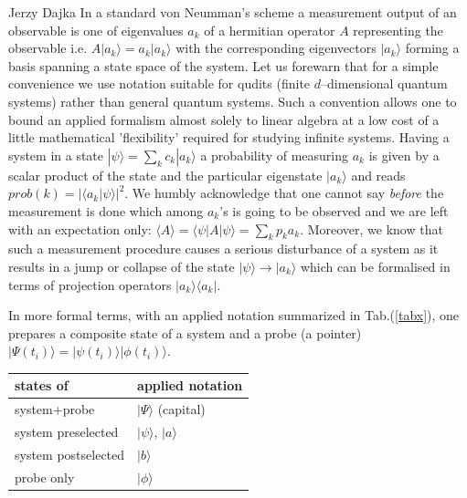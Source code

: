 \begin{artengenv}{Jerzy Dajka}
In a  standard von Neumman's scheme a measurement output of an observable   is one of eigenvalues $a_k$ of  a hermitian operator $A$ representing the observable i.e. $A|a_k\rangle=a_k|a_k\rangle$ with the corresponding eigenvectors  $|a_k\rangle$ forming a basis spanning a state space of the system. Let us forewarn that for a simple convenience we use notation suitable for qudits (finite $d$--dimensional quantum systems) rather than general quantum systems. Such a convention allows one to bound an applied formalism almost solely to linear algebra at a low cost of a little  mathematical 'flexibility' required for studying infinite systems.  Having a system in a state $|\psi\rangle=\sum_k c_k |a_k\rangle$ a probability of measuring $a_k$ is given by a scalar product of the state and the particular eigenstate  $|a_k\rangle$ and reads  $prob(k)=|\langle a_k|\psi\rangle|^2$. We humbly acknowledge that one cannot say {\it before} the measurement is done which among $a_k$'s is going to be  observed and we are left with an expectation only:   $\langle A\rangle =\langle\psi| A|\psi\rangle=\sum_k p_k a_k$. Moreover, we know that such a measurement procedure
     causes a  serious disturbance of a system as it results in  a jump or collapse of the state $|\psi\rangle\rightarrow|a_k\rangle$ which can be formalised in terms of projection operators $|a_k\rangle\langle a_k|$. 



In more formal terms, with an applied notation summarized in Tab.(\ref{tabx}), one prepares a composite state of a system and a probe (a pointer) 
  $|\Psi(t_i)\rangle=|\psi(t_i)\rangle|\phi(t_i)\rangle$. 
\begin{table}[ht]
\centering
\begin{tabular}{|l||l|}
\hline
states of  &applied  notation \\
\hline
\hline
system+probe & $|\Psi\rangle$ (capital)\\
system preselected& $|\psi\rangle$, $|a\rangle$ \\
system postselected& $|b\rangle$ \\
probe only& $|\phi\rangle$\\
\hline


\end{tabular}
\end{table}
\end{artengenv}
